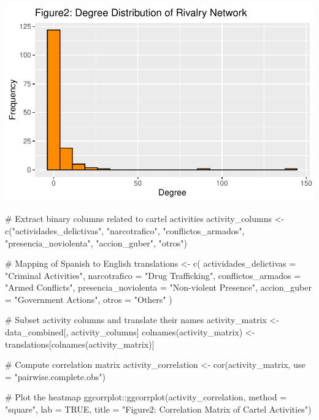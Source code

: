 \documentclass[
]{article}
\newenvironment{Shaded}{\begin{snugshade}}{\end{snugshade}}
\newcommand{\AttributeTok}[1]{\textcolor[rgb]{0.40,0.45,0.13}{#1}}
\newcommand{\CommentTok}[1]{\textcolor[rgb]{0.37,0.37,0.37}{#1}}
\newcommand{\ConstantTok}[1]{\textcolor[rgb]{0.56,0.35,0.01}{#1}}
\newcommand{\FunctionTok}[1]{\textcolor[rgb]{0.28,0.35,0.67}{#1}}
\newcommand{\NormalTok}[1]{\textcolor[rgb]{0.00,0.23,0.31}{#1}}
\newcommand{\OtherTok}[1]{\textcolor[rgb]{0.00,0.23,0.31}{#1}}
\newcommand{\SpecialCharTok}[1]{\textcolor[rgb]{0.37,0.37,0.37}{#1}}
\newcommand{\StringTok}[1]{\textcolor[rgb]{0.13,0.47,0.30}{#1}}
\begin{document}
\includegraphics{Team4GroupProject_files/figure-pdf/unnamed-chunk-22-1.pdf}

\begin{Shaded}
\begin{Highlighting}[]
\CommentTok{\# Extract binary columns related to cartel activities}
\NormalTok{activity\_columns }\OtherTok{\textless{}{-}} \FunctionTok{c}\NormalTok{(}\StringTok{"actividades\_delictivas"}\NormalTok{, }\StringTok{"narcotrafico"}\NormalTok{, }
                      \StringTok{"conflictos\_armados"}\NormalTok{, }\StringTok{"presencia\_noviolenta"}\NormalTok{, }
                      \StringTok{"accion\_guber"}\NormalTok{, }\StringTok{"otros"}\NormalTok{)}

\CommentTok{\# Mapping of Spanish to English}
\NormalTok{translations }\OtherTok{\textless{}{-}} \FunctionTok{c}\NormalTok{(}
  \AttributeTok{actividades\_delictivas =} \StringTok{"Criminal Activities"}\NormalTok{,}
  \AttributeTok{narcotrafico =} \StringTok{"Drug Trafficking"}\NormalTok{,}
  \AttributeTok{conflictos\_armados =} \StringTok{"Armed Conflicts"}\NormalTok{,}
  \AttributeTok{presencia\_noviolenta =} \StringTok{"Non{-}violent Presence"}\NormalTok{,}
  \AttributeTok{accion\_guber =} \StringTok{"Government Actions"}\NormalTok{,}
  \AttributeTok{otros =} \StringTok{"Others"}
\NormalTok{)}

\CommentTok{\# Subset activity columns and translate their names}
\NormalTok{activity\_matrix }\OtherTok{\textless{}{-}}\NormalTok{ data\_combined[, activity\_columns]}
\FunctionTok{colnames}\NormalTok{(activity\_matrix) }\OtherTok{\textless{}{-}}\NormalTok{ translations[}\FunctionTok{colnames}\NormalTok{(activity\_matrix)]}

\CommentTok{\# Compute correlation matrix}
\NormalTok{activity\_correlation }\OtherTok{\textless{}{-}} \FunctionTok{cor}\NormalTok{(activity\_matrix, }\AttributeTok{use =} \StringTok{"pairwise.complete.obs"}\NormalTok{)}

\CommentTok{\# Plot the heatmap}
\NormalTok{ggcorrplot}\SpecialCharTok{::}\FunctionTok{ggcorrplot}\NormalTok{(activity\_correlation, }
                       \AttributeTok{method =} \StringTok{"square"}\NormalTok{, }
                       \AttributeTok{lab =} \ConstantTok{TRUE}\NormalTok{, }
                       \AttributeTok{title =} \StringTok{"Figure2: Correlation Matrix of Cartel Activities"}\NormalTok{)}
\end{Highlighting}
\end{Shaded}
\end{document}
